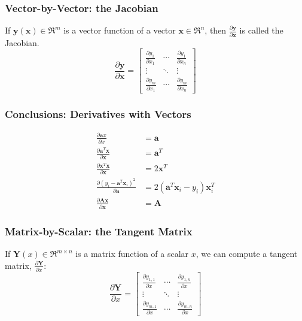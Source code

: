 \documentclass{beamer}
\begin{document}
\begin{frame}
  \frametitle{Vector-by-Vector: the Jacobian}

  If $\mathbf{y}(\mathbf{x})\in\Re^m$ is a vector function of a vector
  $\mathbf{x}\in\Re^n$, then
  $\frac{\partial\mathbf{y}}{\partial\mathbf{x}}$ is called the
  Jacobian.
  \begin{displaymath}
    \frac{\partial\mathbf{y}}{\partial\mathbf{x}}=
    \left[\begin{array}{ccc}
        \frac{\partial y_1}{\partial x_1} & \cdots & \frac{\partial y_1}{\partial x_n}\\
        \vdots&\ddots&\vdots\\
        \frac{\partial y_m}{\partial x_1} & \cdots & \frac{\partial y_m}{\partial x_n}
      \end{array}\right]
  \end{displaymath}        
\end{frame}

\begin{frame}
  \frametitle{Conclusions: Derivatives with Vectors}
  \begin{align*}
    \frac{\partial \mathbf{a}x}{\partial x} &= \mathbf{a}\\
    \frac{\partial \mathbf{a}^T\mathbf{x}}{\partial\mathbf{x}} &= \mathbf{a}^T\\
    \frac{\partial \mathbf{x}^T\mathbf{x}}{\partial\mathbf{x}} &= 2\mathbf{x}^T\\
    \frac{\partial (y_i-\mathbf{a}^T\mathbf{x}_i)^2}{\partial\mathbf{a}}
    &= 2(\mathbf{a}^T\mathbf{x}_i-y_i)\mathbf{x}_i^T\\
    \frac{\partial\mathbf{A}\mathbf{x}}{\partial\mathbf{x}}
    &= \mathbf{A}
  \end{align*}    
\end{frame}

\begin{frame}
  \frametitle{Matrix-by-Scalar: the Tangent Matrix}

  If $\mathbf{Y}(x)\in\Re^{m\times n}$ is a matrix function of a scalar $x$,
  we can compute a tangent matrix,
  $\frac{\partial\mathbf{Y}}{\partial x}$:
  \begin{displaymath}
    \frac{\partial\mathbf{Y}}{\partial x} =
    \left[\begin{array}{ccc}
        \frac{\partial y_{1,1}}{\partial x}&\cdots&\frac{\partial y_{1,n}}{\partial x}\\
        \vdots&\ddots&\vdots\\
        \frac{\partial y_{m,1}}{\partial x}&\cdots&\frac{\partial y_{m,n}}{\partial x}
      \end{array}\right]
  \end{displaymath}
\end{frame}
\end{document}

